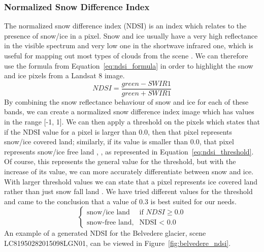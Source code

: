 \documentclass[11pt, a4paper]{report}
\begin{document}
	
	\subsubsection{Normalized Snow Difference Index}
	\label{seq:ndsi_functional}
	
	The normalized snow difference index (NDSI) is an index which relates to the presence of snow/ice in a pixel. Snow and ice usually have a very high reflectance in the visible spectrum and very low one in the shortwave infrared one, which is useful for mapping out most types of clouds from the scene \cite{ndsi}. We can therefore use the formula from Equation~\ref{eq:ndsi_formula} in order to highlight the snow and ice pixels from a Landsat 8 image.
	\begin{equation}\label{eq:ndsi_formula}
		NDSI = \frac{green - SWIR1}{green + SWIR1}
	\end{equation}
	By combining the snow reflectance behaviour of snow and ice for each of these bands, we can create a normalized snow difference index image which has values in the range [-1, 1]. We can then apply a threshold on the pixels which states that if the NDSI value for a pixel is larger than 0.0, then that pixel represents snow/ice covered land; similarly, if its value is smaller than 0.0, that pixel represents snow/ice free land \cite{ndsi}, \cite{viirs}, as represented in Equation~\ref{eq:ndsi_threshold}. Of course, this represents the general value for the threshold, but with the increase of its value, we can more accurately differentiate between snow and ice. With larger threshold values we can state that a pixel represents ice covered land rather than just snow fall land \cite{viirs}. We have tried different values for the threshold and came to the conclusion that a value of 0.3 is best suited for our needs.
	\begin{equation}
		\begin{cases}\label{eq:ndsi_threshold}
			\text{snow/ice land} & \text{if } NDSI \geq 0.0\\
			\text{snow-free land}, & \text{NDSI < 0.0}
		\end{cases}
	\end{equation}
	An example of a generated NDSI for the Belvedere glacier, scene LC81950282015098LGN01, can be viewed in Figure~\ref{fig:belvedere_ndsi}.
\end{document}

